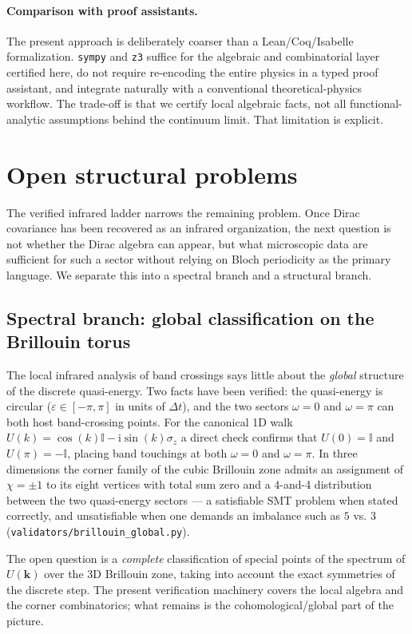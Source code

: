 \documentclass[a4paper,onecolumn,11pt]{quantumarticle}
\newcommand{\ii}{\ensuremath{\mathrm{i}}}
\newcommand{\bbI}{\ensuremath{\mathbb{I}}}
\def\vk{\ensuremath{\bm{k}}}
\newcommand{\Uop}{\ensuremath{U}}
\begin{document}
\paragraph{Comparison with proof assistants.}
The present approach is deliberately coarser than a Lean/Coq/Isabelle formalization. \texttt{sympy} and \texttt{z3} suffice for the algebraic and combinatorial layer certified here, do not require re-encoding the entire physics in a typed proof assistant, and integrate naturally with a conventional theoretical-physics workflow. The trade-off is that we certify local algebraic facts, not all functional-analytic assumptions behind the continuum limit. That limitation is explicit.


\section{Open structural problems}
\label{p:open-problems}

The verified infrared ladder narrows the remaining problem. Once Dirac covariance has been recovered as an infrared organization, the next question is not whether the Dirac algebra can appear, but what microscopic data are sufficient for such a sector without relying on Bloch periodicity as the primary language. We separate this into a spectral branch and a structural branch.

\subsection{Spectral branch: global classification on the Brillouin torus}
The local infrared analysis of band crossings says little about the \emph{global} structure of the discrete quasi-energy. Two facts have been verified: the quasi-energy is circular ($\varepsilon\in[-\pi,\pi]$ in units of $\Delta t$), and the two sectors $\omega=0$ and $\omega=\pi$ can both host band-crossing points. For the canonical 1D walk $\Uop(k) = \cos(k)\bbI - \ii\sin(k)\sigma_{z}$ a direct check confirms that $\Uop(0)=\bbI$ and $\Uop(\pi)=-\bbI$, placing band touchings at both $\omega=0$ and $\omega=\pi$. In three dimensions the corner family of the cubic Brillouin zone admits an assignment of $\chi=\pm 1$ to its eight vertices with total sum zero and a 4-and-4 distribution between the two quasi-energy sectors --- a satisfiable SMT problem when stated correctly, and unsatisfiable when one demands an imbalance such as $5$ vs. $3$ (\texttt{validators/brillouin\_global.py}).

The open question is a \emph{complete} classification of special points of the spectrum of $\Uop(\vk)$ over the 3D Brillouin zone, taking into account the exact symmetries of the discrete step. The present verification machinery covers the local algebra and the corner combinatorics; what remains is the cohomological/global part of the picture.
\end{document}
